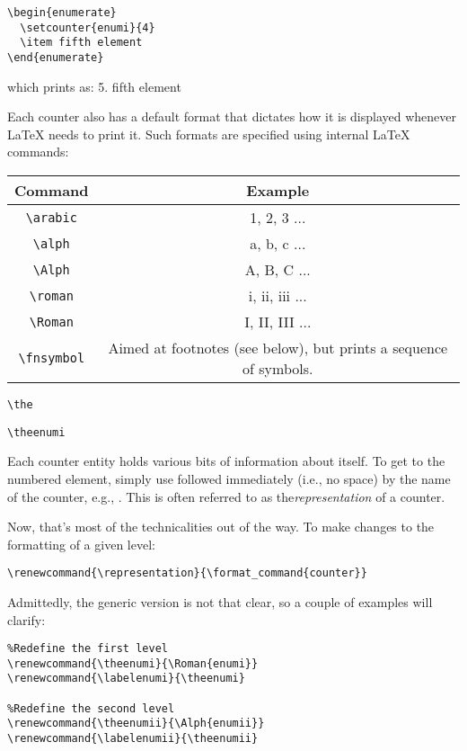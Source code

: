 \begin{lstlisting}
\begin{enumerate}
  \setcounter{enumi}{4}
  \item fifth element
\end{enumerate}
\end{lstlisting}

which prints as: 5. fifth element

Each counter also has a default format that dictates how it is displayed
whenever LaTeX needs to print it. Such formats are specified using internal
LaTeX commands:

\begin{tabular}{c c} \hline
 Command
&  Example
\\ \hline
\verb|\arabic|
&  1, 2, 3 ...
\\ \hline
\verb|\alph|
&  a, b, c ...
\\ \hline
\verb|\Alph|
&  A, B, C ...
\\ \hline
\verb|\roman|
&  i, ii, iii ...
\\ \hline
\verb|\Roman|
&  I, II, III ...
\\ \hline
\verb|\fnsymbol|
&  Aimed at footnotes (see below), but prints a sequence of symbols. \\ \hline
\end{tabular}

\begin{lstlisting}
\the
\end{lstlisting}
  \begin{lstlisting}
\theenumi
\end{lstlisting}
 Each counter entity holds various bits of information about itself. To get to
the numbered element, simply use  followed immediately (i.e., no space) by the
name of the counter, e.g., . This is often referred to as
the\textit{representation} of a counter. 

Now, that's most of the technicalities out of the way. To make changes to the
formatting of a given level:
\begin{lstlisting}
\renewcommand{\representation}{\format_command{counter}}
\end{lstlisting}

Admittedly, the generic version is not that clear, so a couple of examples will
clarify:
\begin{lstlisting}
%Redefine the first level
\renewcommand{\theenumi}{\Roman{enumi}}
\renewcommand{\labelenumi}{\theenumi}

%Redefine the second level
\renewcommand{\theenumii}{\Alph{enumii}}
\renewcommand{\labelenumii}{\theenumii}
\end{lstlisting}

